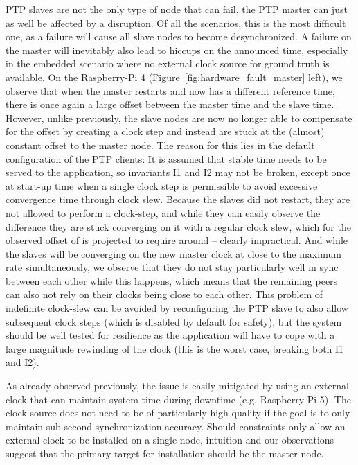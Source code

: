 PTP slaves are not the only type of node that can fail, the PTP master can just as well be affected by a disruption. Of all the scenarios, this is the most difficult one, as a failure will cause all slave nodes to become desynchronized. A failure on the master will inevitably also lead to hiccups on the announced time, especially in the embedded scenario where no external clock source for ground truth is available. On the Raspberry-Pi 4 (Figure~\ref{fig:hardware_fault_master} left), we observe that when the master restarts and now has a different reference time, there is once again a large offset between the master time and the slave time. However, unlike previously, the slave nodes are now no longer able to compensate for the offset by creating a clock step and instead are stuck at the (almost) constant offset to the master node. The reason for this lies in the default configuration of the PTP clients: It is assumed that stable time needs to be served to the application, so invariants I1 and I2 may not be broken, except once at start-up time when a single clock step is permissible to avoid excessive convergence time through clock slew. Because the slaves did not restart, they are not allowed to perform a clock-step, and while they can easily observe the difference they are stuck converging on it with a regular clock slew, which for the observed offset of \fTimeMin{\maxPiFour} is projected to require around \fTimeMin[-3]{\maxPiFour/\maxClockSlew} -- clearly impractical. And while the slaves will be converging on the new master clock at close to the maximum rate simultaneously, we observe that they do not stay particularly well in sync between each other while this happens, which means that the remaining peers can also not rely on their clocks being close to each other. This problem of indefinite clock-slew can be avoided by reconfiguring the PTP slave to also allow subsequent clock steps (which is disabled by default for safety), but the system should be well tested for resilience as the application will have to cope with a large magnitude rewinding of the clock (this is the worst case, breaking both I1 and I2).

As already observed previously, the issue is easily mitigated by using an external clock that can maintain system time during downtime (e.g. Raspberry-Pi 5). The clock source does not need to be of particularly high quality if the goal is to only maintain sub-second synchronization accuracy. Should constraints only allow an external clock to be installed on a single node, intuition and our observations suggest that the primary target for installation should be the master node.


